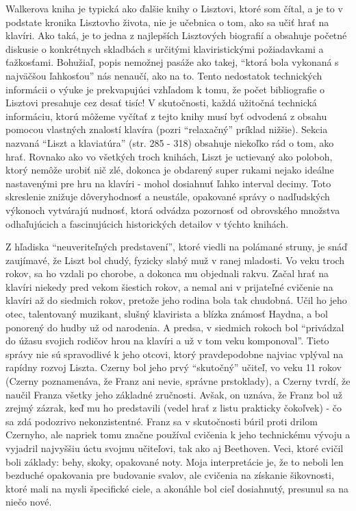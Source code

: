 \documentclass[11pt,a4paper]{book}
\begin{document}
Walkerova kniha je typická ako ďalšie knihy o Lisztovi, ktoré som čítal, a je to v podstate kronika Lisztovho života, nie je učebnica o tom, ako sa učiť hrať na klavíri. Ako taká, je to jedna z najlepších Lisztových biografií a obsahuje početné diskusie o konkrétnych skladbách s určitými klaviristickými požiadavkami a ťažkosťami. Bohužiaľ, popis nemožnej pasáže ako takej, “ktorá bola vykonaná s najväčšou ľahkosťou” nás nenaučí, ako na to. Tento nedostatok technických informácii o výuke je prekvapujúci vzhľadom k tomu, že počet bibliografie o Lisztovi presahuje cez desať tisíc! V skutočnosti, každá užitočná technická informáciu, ktorú môžeme vyčítať z tejto knihy musí byť odvodená z obsahu pomocou vlastných znalostí klavíra (pozri “relaxačný” príklad nižšie). Sekcia nazvaná “Liszt a klaviatúra” (str. 285 - 318) obsahuje niekoľko rád o tom, ako hrať. Rovnako ako vo všetkých troch knihách, Liszt je uctievaný ako poloboh, ktorý nemôže urobiť nič zlé, dokonca je obdarený super rukami nejako ideálne nastavenými pre hru na klavíri - mohol dosiahnuť ľahko interval decimy. Toto skreslenie znižuje dôveryhodnosť a neustále, opakované správy o nadľudských výkonoch vytvárajú nudnosť, ktorá odvádza pozornosť od obrovského množstva odhaľujúcich a fascinujúcich historických detailov v týchto knihách. 

Z hľadiska “neuveriteľných predstavení”, ktoré viedli na polámané struny, je snáď zaujímavé, že Liszt bol chudý, fyzicky slabý muž v ranej mladosti. Vo veku troch rokov, sa ho vzdali po chorobe, a dokonca mu objednali rakvu. Začal hrať na klavíri niekedy pred vekom šiestich rokov, a nemal ani v prijateľné cvičenie na klavíri až do siedmich rokov, pretože jeho rodina bola tak chudobná. Učil ho jeho otec, talentovaný muzikant, slušný klavirista a blízka známosť Haydna, a bol ponorený do hudby už od narodenia. A predsa, v siedmich rokoch bol “privádzal do úžasu svojich rodičov hrou na klavíri a už v tom veku komponoval”. Tieto správy nie sú spravodlivé k jeho otcovi, ktorý pravdepodobne najviac vplýval na rapídny rozvoj Liszta. Czerny bol jeho prvý “skutočný” učiteľ, vo veku 11 rokov (Czerny poznamenáva, že Franz ani nevie, správne prstoklady), a Czerny tvrdí, že naučil Franza všetky jeho základné zručnosti. Avšak, on uznáva, že Franz bol už zrejmý zázrak, keď mu ho predstavili (vedel hrať z listu prakticky čokoľvek) - čo sa zdá podozrivo nekonzistentné. Franz sa v skutočnosti búril proti drilom Czernyho, ale napriek tomu značne používal cvičenia k jeho technickému vývoju a vyjadril najvyššiu úctu svojmu učiteľovi, tak ako aj Beethoven. Veci, ktoré cvičil boli základy: behy, skoky, opakované noty. Moja interpretácie je, že to neboli len bezduché opakovania pre budovanie svalov, ale cvičenia na získanie šikovnosti, ktoré mali na mysli špecifické ciele, a akonáhle bol cieľ dosiahnutý, presunul sa na niečo nové. 
\end{document}
